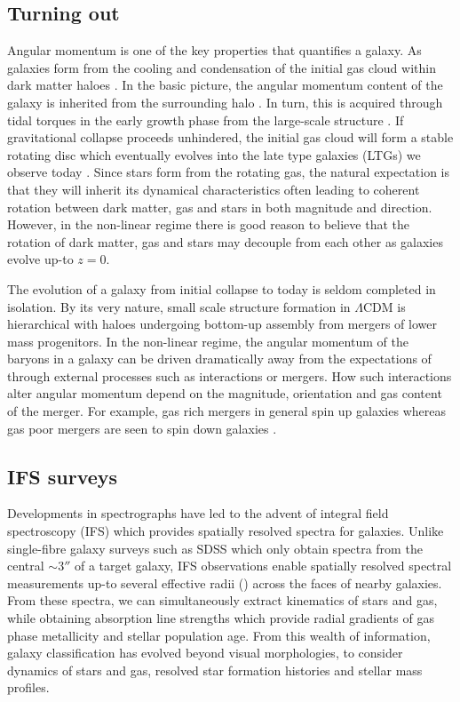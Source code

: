 \subsection{Turning out}
Angular momentum is one of the key properties that quantifies a galaxy. As galaxies form from the cooling and condensation of the initial gas cloud within dark matter haloes \citep{white1978, mo1998}. In the basic picture, the angular momentum content of the galaxy is inherited from the surrounding halo \citep[][]{fall1980}. In turn, this is acquired through tidal torques in the early growth phase from the large-scale structure \citep[e.g.][]{peebles1969, Doroshkevich1970}. If gravitational collapse proceeds unhindered, the initial gas cloud will form a stable rotating disc which eventually evolves into the late type galaxies (LTGs) we observe today \citep{white1978}. Since stars form from the rotating gas, the natural expectation is that they will inherit its dynamical characteristics often leading to coherent rotation between dark matter, gas and stars in both magnitude and direction. However, in the non-linear regime there is good reason to believe that the rotation of dark matter, gas and stars may decouple from each other as galaxies evolve up-to $z=0$. 

The evolution of a galaxy from initial collapse to today is seldom completed in isolation. By its very nature, small scale structure formation in $\Lambda$CDM is hierarchical with haloes undergoing bottom-up assembly from mergers of lower mass progenitors. In the non-linear regime, the angular momentum of the baryons in a galaxy can be driven dramatically away from the expectations of  through external processes such as interactions or mergers. How such interactions alter angular momentum depend on the magnitude, orientation and gas content of the merger. For example, gas rich mergers in general spin up galaxies whereas gas poor mergers are seen to spin down galaxies \citep[][]{lagos2017,lagos2018}.

\subsection{IFS surveys} \label{sec:ifs_surveys_intro}
Developments in spectrographs have led to the advent of integral field spectroscopy (IFS) which provides spatially resolved spectra for galaxies. Unlike single-fibre galaxy surveys such as SDSS which only obtain spectra from the central $\sim 3 ''$ of a target galaxy, IFS observations enable spatially resolved spectral measurements up-to several effective radii (\re) across the faces of nearby galaxies. From these spectra, we can simultaneously extract kinematics of stars and gas, while obtaining absorption line strengths which provide radial gradients of gas phase metallicity and stellar population age. From this wealth of information, galaxy classification has evolved beyond visual morphologies, to consider dynamics of stars and gas, resolved star formation histories and stellar mass profiles. 

